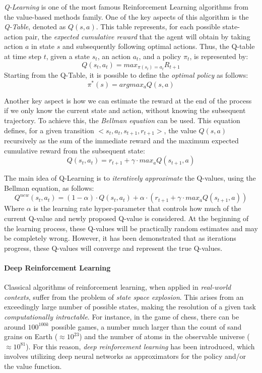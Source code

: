 \documentclass[12pt,a4paper,openright,twoside]{book}
\begin{document}
\emph{Q-Learning} is one of the most famous Reinforcement Learning algorithms from the value-based methods family. 
    One of the key aspects of this algorithm is the \emph{Q-Table}, denoted as $Q(s,a)$. This table represents, 
    for each possible state-action pair, the \emph{expected cumulative reward} that the agent will obtain by
    taking action $a$ in state $s$ and subsequently following optimal actions. 
    Thus, the Q-table at time step $t$, given a state $s_t$, an action $a_t$, and a policy $\pi_t$, is represented by:
    $$ Q(s_t, a_t) = max_{\pi(s_t) = a_t} R_{t+1}$$
    Starting from the Q-Table, it is possible to define the \emph{optimal policy} as follows:
    $$ \pi^{*}(s) = argmax_a Q(s,a) $$

Another key aspect is how we can estimate the reward at the end of the process if we only know the current state 
    and action, without knowing the subsequent trajectory. To achieve this, the \emph{Bellman equation} can be used. 
    This equation defines, for a given transition $<s_t, a_t, s_{t+1}, r_{t+1}>$, the value $Q(s,a)$ recursively 
    as the sum of the immediate reward and the maximum expected cumulative reward from the subsequent state:
    $$ Q(s_t,a_t) =  r_{t+1} + \gamma \cdot max_a Q(s_{t+1}, a)$$

The main idea of Q-Learning is to \emph{iteratively approximate} the Q-values, using the Bellman equation, as follows:
$$ Q^{new}(s_t,a_t) = (1-\alpha) \cdot Q(s_t,a_t) + \alpha \cdot (r_{t+1} + \gamma \cdot max_a Q(s_{t+1}, a)) $$
    Where $\alpha$ is the learning rate hyper-parameter that controls how much of the current Q-value and newly proposed
    Q-value is considered.
    At the beginning of the learning process, these Q-values will be practically random estimates and may be completely wrong. 
    However, it has been demonstrated that as iterations progress, these Q-values will 
    converge and represent the true Q-values.

\paragraph{Deep Reinforcement Learning}

Classical algorithms of reinforcement learning, when applied in \emph{real-world contexts}, suffer from the problem of \emph{state space explosion}.
    This arises from an exceedingly large number of possible states, making the resolution of a given task \emph{computationally intractable}. 
    For instance, in the game of chess, there can be around $100^{100k}$ possible games, a number much larger than 
    the count of sand grains on Earth ($\approx 10^{23}$) and the number of atoms in the observable universe 
    ($\approx 10^{81}$). 
    For this reason, \emph{deep reinforcement learning} has been introduced, which involves utilizing deep neural networks
    as approximators for the policy and/or the value function.
\end{document}
